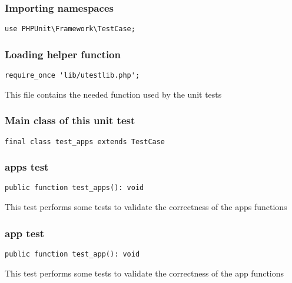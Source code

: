 \documentclass[a4paper]{article}
\begin{document}
\hypertarget{toc30}{}
\subsubsection{Importing namespaces}

\begin{lstlisting}
use PHPUnit\Framework\TestCase;
\end{lstlisting}

\hypertarget{toc31}{}
\subsubsection{Loading helper function}

\begin{lstlisting}
require_once 'lib/utestlib.php';
\end{lstlisting}

This file contains the needed function used by the unit tests

\hypertarget{toc32}{}
\subsubsection{Main class of this unit test}

\begin{lstlisting}
final class test_apps extends TestCase
\end{lstlisting}

\hypertarget{toc33}{}
\subsubsection{apps test}

\begin{lstlisting}
public function test_apps(): void
\end{lstlisting}

This test performs some tests to validate the correctness
of the apps functions

\hypertarget{toc34}{}
\subsubsection{app test}

\begin{lstlisting}
public function test_app(): void
\end{lstlisting}

This test performs some tests to validate the correctness
of the app functions

\hypertarget{toc35}{}
\end{document}
